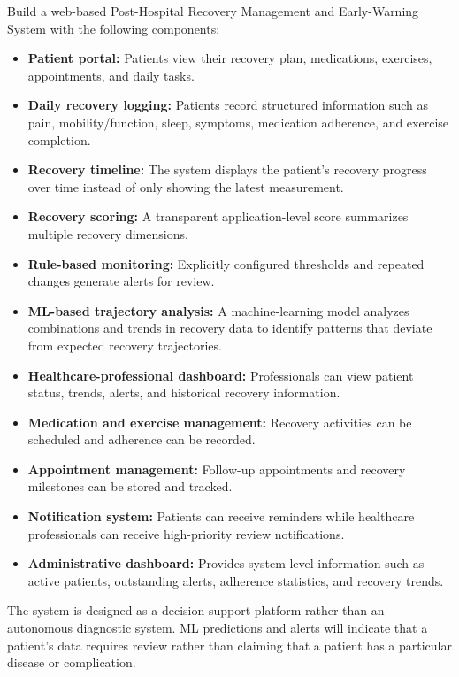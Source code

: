 \documentclass[11pt,a4paper]{article}
\begin{document}
Build a web-based Post-Hospital Recovery Management and
Early-Warning System with the following components:
\begin{itemize}[leftmargin=0.7cm]
    \item \textbf{Patient portal:} Patients view their recovery plan, medications, exercises, appointments, and daily tasks.
    \item \textbf{Daily recovery logging:} Patients record structured information such as pain, mobility/function, sleep, symptoms, medication adherence, and exercise completion.
    \item \textbf{Recovery timeline:} The system displays the patient's recovery progress over time instead of only showing the latest measurement.
    \item \textbf{Recovery scoring:} A transparent application-level score summarizes multiple recovery dimensions.
    \item \textbf{Rule-based monitoring:} Explicitly configured thresholds and repeated changes generate alerts for review.
    \item \textbf{ML-based trajectory analysis:} A machine-learning model analyzes combinations and trends in recovery data to identify patterns that deviate from expected recovery trajectories.
    \item \textbf{Healthcare-professional dashboard:} Professionals can view patient status, trends, alerts, and historical recovery information.
    \item \textbf{Medication and exercise management:} Recovery activities can be scheduled and adherence can be recorded.
    \item \textbf{Appointment management:} Follow-up appointments and recovery milestones can be stored and tracked.
    \item \textbf{Notification system:} Patients can receive reminders while healthcare professionals can receive high-priority review notifications.
    \item \textbf{Administrative dashboard:} Provides system-level information such as active patients, outstanding alerts, adherence statistics, and recovery trends.
\end{itemize}

The system is designed as a decision-support platform rather
than an autonomous diagnostic system. ML predictions and alerts will indicate
that a patient's data requires review rather than claiming that a patient has a
particular disease or complication.
\end{document}
